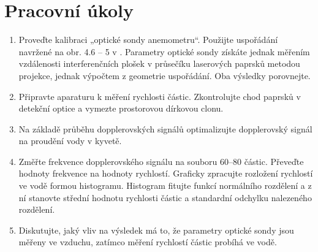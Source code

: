 \documentclass[a4paper]{article}
\author{Vladislav Wohlrath}
\begin{document}
\begin{titlepage}

\end{titlepage}

\section*{Pracovní úkoly}
\begin{enumerate}
\item Proveďte kalibraci „optické sondy anemometru“. Použijte uspořádání navržené na obr. 4.6 – 5 v \cite{skripta}. Parametry optické sondy získáte jednak měřením vzdálenosti interferenčních plošek v průsečíku laserových paprsků metodou projekce, jednak výpočtem z geometrie uspořádání. Oba výsledky porovnejte.
\item Připravte aparaturu k měření rychlosti částic. Zkontrolujte chod paprsků v detekční optice a vymezte prostorovou dírkovou clonu.
\item Na základě průběhu dopplerovských signálů optimalizujte dopplerovský signál na proudění vody v kyvetě.
\item Změřte frekvence dopplerovského signálu na souboru 60--80 částic. Převeďte hodnoty frekvence na hodnoty rychlostí. Graficky zpracujte rozložení rychlostí ve vodě formou histogramu. Histogram fitujte funkcí normálního rozdělení a z ní stanovte střední hodnotu rychlosti částic a standardní odchylku nalezeného rozdělení.
\item Diskutujte, jaký vliv na výsledek má to, že parametry optické sondy jsou měřeny ve vzduchu, zatímco měření rychlostí částic probíhá ve vodě.
\end{enumerate}










\printbibliography[title={Seznam použité literatury}]
\end{document}
